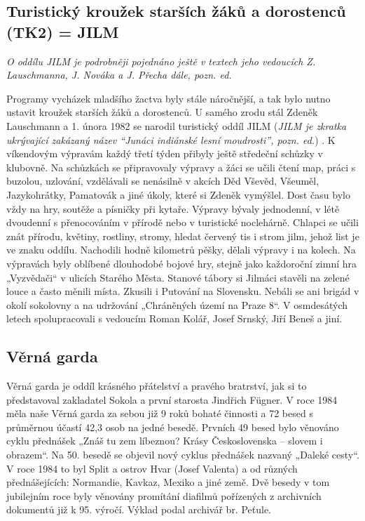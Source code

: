 \subsection{Turistický kroužek starších žáků a dorostenců (TK2) =
JILM}\label{turistickuxfd-krouux17eek-starux161uxedch-ux17euxe1kux16f-a-dorostencux16f-tk2-jilm}

\emph{O oddílu JILM je podrobněji pojednáno ještě v textech jeho
vedoucích Z. Lauschmanna, J. Nováka a J. Přecha dále, pozn. ed.}

Programy vycházek mladšího žactva byly stále náročnější, a tak bylo
nutno ustavit kroužek starších žáků a dorostenců. U samého zrodu stál
Zdeněk Lauschmann a 1. února 1982 se narodil turistický oddíl JILM
(\emph{JILM je zkratka ukrývající zakázaný název ``Junáci indiánské
lesní moudrosti'', pozn. ed.}) . K víkendovým výpravám každý třetí týden
přibyly ještě středeční schůzky v klubovně. Na schůzkách se připravovaly
výpravy a žáci se učili čtení map, práci s buzolou, uzlování, vzdělávali
se nenásilně v akcích Děd Vševěd, Všeuměl, Jazykohrátky, Pamatovák a
jiné úkoly, které si Zdeněk vymýšlel. Dost času bylo vždy na hry,
soutěže a písničky při kytaře. Výpravy bývaly jednodenní, v létě
dvoudenní s přenocováním v přírodě nebo v turistické noclehárně. Chlapci
se učili znát přírodu, květiny, rostliny, stromy, hledat červený tis i
strom jilm, jehož list je ve znaku oddílu. Nachodili hodně kilometrů
pěšky, dělali výpravy i na kolech. Na výpravách byly oblíbené dlouhodobé
bojové hry, stejně jako každoroční zimní hra „Vyzvědači`` v ulicích
Starého Města. Stanové tábory si Jilmáci stavěli na zelené louce a často
měnili místa. Zkusili i Putování na Slovensku. Nebáli se ani brigád v
okolí sokolovny a na udržování „Chráněných území na Praze 8``. V
osmdesátých letech spolupracovali s vedoucím Roman Kolář, Josef Srnský,
Jiří Beneš a jiní.

\subsection{Věrná garda}\label{vux11brnuxe1-garda}

Věrná garda je oddíl krásného přátelství a pravého bratrství, jak si to
představoval zakladatel Sokola a první starosta Jindřich Fügner. V roce
1984 měla naše Věrná garda za sebou již 9 roků bohaté činnosti a 72
besed s průměrnou účastí 42,3 osob na jedné besedě. Prvních 49 besed
bylo věnováno cyklu přednášek „Znáš tu zem líbeznou? Krásy
Československa -- slovem i obrazem``. Na 50. besedě se objevil nový
cyklus přednášek nazvaný „Daleké cesty``. V roce 1984 to byl Split a
ostrov Hvar (Josef Valenta) a od různých přednášejících: Normandie,
Kavkaz, Mexiko a jiné země. Dvě besedy v tom jubilejním roce byly
věnovány promítání diafilmů pořízených z archivních dokumentů již k 95.
výročí. Výklad podal archivář br. Peťule.

